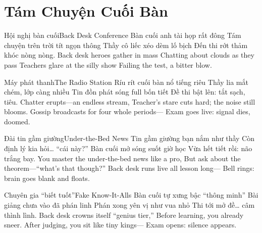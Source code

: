 \chapter{Tám Chuyện Cuối Bàn}


\begin{tutuyetbox}{Hội nghị bàn cuối}{Back Desk Conference}
Bàn cuối anh tài họp rất đông
Tám chuyện trên trời tít ngọn thông
Thầy cô liếc xéo dèm lố bịch
Đến thi rớt thảm khóc nòng nòng.
\tcblower
Back desk heroes gather in mass 
Chatting about clouds as they pass 
Teachers glare at the silly show 
Failing the test, a bitter blow.
\end{tutuyetbox}

\begin{tutuyetbox}{Máy phát thanh}{The Radio Station}
Ríu rít cuối bàn nổ tiếng riêu
Thầy lia mắt chém, lớp càng nhiều
Tin đồn phát sóng full bốn tiết
Đề thi bật lên: tắt sạch, tiêu.
\tcblower
Chatter erupts—an endless stream,
Teacher’s stare cuts hard; the noise still blooms.
Gossip broadcasts for four whole periods—
Exam goes live: signal dies, doomed.
\end{tutuyetbox}


\begin{tutuyetbox}{Đài tin gầm giường}{Under-the-Bed News}
Tin gầm giường bạn nắm như thầy
Còn định lý kia hỏi… “cái này?”
Bàn cuối mở sóng suốt giờ học
Vừa hết tiết rồi: não trắng bay.
\tcblower
You master the under-the-bed news like a pro,
But ask about the theorem—“what’s that though?”
Back desk runs live all lesson long—
Bell rings: brain goes blank and floats.
\end{tutuyetbox}

\begin{tutuyetbox}{Chuyên gia “biết tuốt”}{Fake Know-It-Alls}
Bàn cuối tự xưng bậc “thông minh”
Bài giảng chưa vào đã phán linh
Phán xong yên vị như vua nhỏ
Thi tới mở đề… câm thình lình.
\tcblower
Back desk crowns itself “genius tier,”
Before learning, you already sneer.
After judging, you sit like tiny kings—
Exam opens: silence appears.
\end{tutuyetbox}

